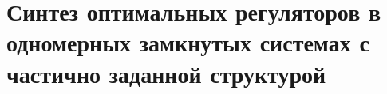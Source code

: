 \section{Синтез оптимальных регуляторов в одномерных замкнутых системах с частично заданной структурой}
\clearpage